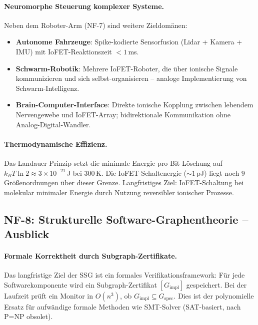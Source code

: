 ﻿\documentclass[a4paper,12pt]{scrreprt}
\theoremstyle{definition}
\begin{document}
\paragraph{Neuromorphe Steuerung komplexer Systeme.}
Neben dem Roboter-Arm (NF-7) sind weitere Zieldomänen:
\begin{itemize}
  \item \textbf{Autonome Fahrzeuge}: Spike-kodierte Sensorfusion
    (Lidar + Kamera + IMU) mit IoFET-Reaktionszeit $< 1$\,ms.
  \item \textbf{Schwarm-Robotik}: Mehrere IoFET-Roboter, die
    über ionische Signale kommunizieren und sich
    selbst-organisieren -- analoge Implementierung von
    Schwarm-Intelligenz.
  \item \textbf{Brain-Computer-Interface}: Direkte ionische
    Kopplung zwischen lebendem Nervengewebe und IoFET-Array;
    bidirektionale Kommunikation ohne Analog-Digital-Wandler.
\end{itemize}

\paragraph{Thermodynamische Effizienz.}
Das Landauer-Prinzip setzt die minimale Energie pro Bit-Löschung
auf $k_B T \ln 2 \approx 3 \times 10^{-21}$\,J bei 300\,K.
Die IoFET-Schaltenergie ($\sim 1$\,pJ) liegt noch $9$ Größenordnungen
über dieser Grenze. Langfristiges Ziel: IoFET-Schaltung bei
molekular minimaler Energie durch Nutzung reversibler ionischer
Prozesse.

\subsection*{NF-8: Strukturelle Software-Graphentheorie -- Ausblick}

\paragraph{Formale Korrektheit durch Subgraph-Zertifikate.}
Das langfristige Ziel der SSG ist ein formales Verifikationsframework:
Für jede Softwarekomponente wird ein Subgraph-Zertifikat
$[G_\mathrm{impl}]$ gespeichert. Bei der Laufzeit prüft ein
Monitor in $O(n^3)$, ob $G_\mathrm{impl} \subseteq G_\mathrm{spec}$.
Dies ist der polynomielle Ersatz für aufwändige formale Methoden
wie SMT-Solver (SAT-basiert, nach P=NP obsolet).
\end{document}

